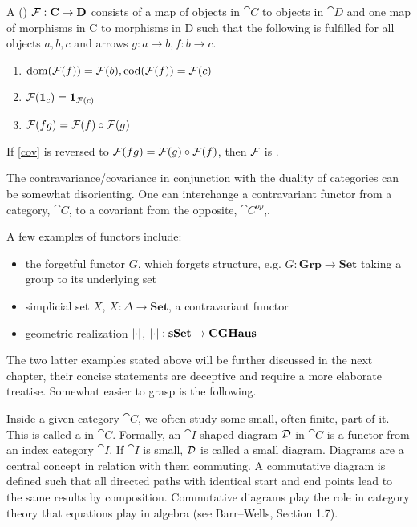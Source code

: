 \documentclass[../../main.tex]{subfiles}
\begin{document}
    \begin{definition}
        A ()  $\functor{F}: \cat{C} \to \cat{D}$ consists of a map of objects in $\cat{C}$ to objects in $\cat{D}$ and one map of morphisms in C to morphisms in D such that the following is fulfilled for all objects $a, b, c$ and arrows $g: a \to b, f: b \to c$.
        
        \begin{enumerate}
            \item $\domain{\functor{F}(f)} = \functor{F}(b), \codomain{\functor{F}(f)} = \functor{F}(c)$
            \item $\functor{F}(\idarrow[c]) = \idarrow[\functor{F}(c)]$
            \item $\functor{F}(fg) = \functor{F}(f) \circ \functor{F}(g)$ \label{cov}
        \end{enumerate}
        
        If \ref{cov} is reversed to $\functor{F}(fg) = \functor{F}(g) \circ \functor{F}(f)$, then $\functor{F}$ is .
    \end{definition}
    
    The contravariance/covariance in conjunction with the duality of categories can be somewhat disorienting. One can interchange a contravariant functor from a category, $\cat{C}$, to a covariant from the opposite, $\cat{C^{op}}$,.

    \begin{example}\label{functor_exmp}
        A few examples of functors include:
        \begin{itemize}
            \item the forgetful functor $G$, which forgets structure, e.g. $G:\mathbf{Grp}\to \mathbf{Set}$ taking a group to its underlying set
            \item simplicial set $X$, $X:\Delta\to \mathbf{Set}$, a contravariant functor
            \item geometric realization $\geom[\cdot]$, $\geom[\cdot]:\mathbf{sSet}\to \mathbf{CGHaus}$
        \end{itemize}
    \end{example}

    The two latter examples stated above will be further discussed in the next chapter, their concise statements are deceptive and require a more elaborate treatise. Somewhat easier to grasp is the following.
    
    Inside a given category $\cat{C}$, we often study some small, often finite, part of it. This is called a  in $\cat{C}$. Formally, an $\cat{I}$-shaped diagram $\functor{D}$ in $\cat{C}$ is a functor from an index category $\cat{I}$. If $\cat{I}$ is small, $\functor{D}$ is called a small diagram. Diagrams are a central concept in relation with them commuting. A commutative diagram is defined such that all directed paths with identical start and end points lead to the same results by composition. Commutative diagrams play the role in category theory that equations play in algebra (see Barr–Wells, Section 1.7).%
    
\end{document}
